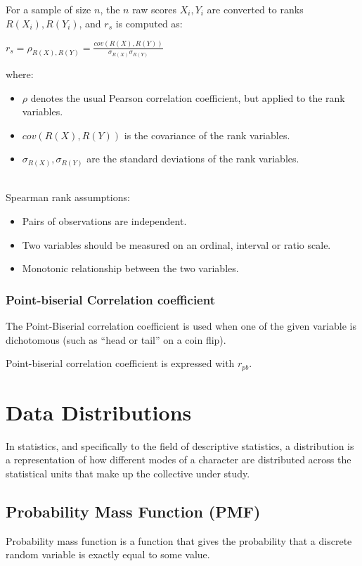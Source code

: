 \documentclass{article}
\begin{document}
For a sample of size $n$, the $n$ raw scores $ X_{i},Y_{i}$ are converted to ranks ${R} ({X_{i}}), {R} ({Y_{i}})$, and $ r_{s}$ is computed as:

$\displaystyle r_{s}=\rho _{{R} (X), {R} (Y)}={\frac { {cov} ( {R} (X),{R} (Y))}{\sigma _{ {R} (X)}\sigma _{{R} (Y)}}}$

where:
\begin{itemize}
    \item $\rho$ denotes the usual Pearson correlation coefficient, but applied to the rank variables.
    \item ${cov} ( {R} (X),{R} (Y))$  is the covariance of the rank variables.
    \item $\sigma _{ {R} (X)}, \sigma _{{R} (Y)}$ are the standard deviations of the rank variables.
\end{itemize}

\mbox{}\\

Spearman rank assumptions:
\begin{itemize}
    \item Pairs of observations are independent.
    \item Two variables should be measured on an ordinal, interval or ratio scale.
    \item Monotonic relationship between the two variables.
\end{itemize}

\subsubsection{Point-biserial Correlation coefficient}
The Point-Biserial correlation coefficient is used when one of the given variable is dichotomous (such as “head or tail” on a coin flip).

Point-biserial correlation coefficient is expressed with $r_{pb}$.

\clearpage

\section{Data Distributions}
In statistics, and specifically to the field of descriptive statistics, a distribution is a representation of how different modes of a character are distributed across the statistical units that make up the collective under study.

\subsection{Probability Mass Function (PMF)}
Probability mass function is a function that gives the probability that a discrete random variable is exactly equal to some value. 
\end{document}
